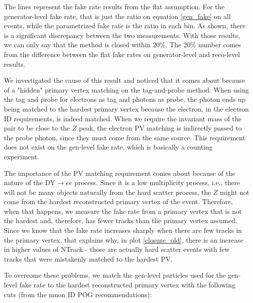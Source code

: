 
The lines represent the fake rate results from the flat assumption. For the generator-level fake rate, that is just the ratio on equation \ref{gen_fake} on all events, while the parametrized fake rate is the ratio in each bin. As shown, there is a significant discrepancy between the two measurements. With those results, we can only say that the method is closed within 20\%. The 20\% number comes from the difference between the flat fake rates on generator-level and reco-level results.

We investigated the cause of this result and noticed that it comes about because of a "hidden" primary vertex matching on the tag-and-probe method. When using the tag and probe for electrons as tag and photons as probe, the photon ends up being matched to the hardest primary vertex because the electron, in the electron ID requirements, is indeed matched. When we require the invariant mass of the pair to be close to the $Z$ peak, the electron PV matching is indirectly passed to the probe photon, since they must come from the same source. This requirement does not exist on the gen-level fake rate, which is basically a counting experiment.

The importance of the PV matching requirement comes about because of the nature of the DY$\to ee$ process. Since it is a low multiplicity process, i.e., there will not be many objects naturally from the hard scatter process, the $Z$ might not come from the hardest reconstructed primary vertex of the event. Therefore, when that happens, we measure the fake rate from a  primary vertex that is not the hardest and, therefore, has fewer tracks than the primary vertex assumed. Since we know that the fake rate increases sharply when there are few tracks in the primary vertex, that explains why, in plot \ref{closure_old}, there is an increase in higher values of NTrack - those are actually hard scatter events with few tracks that were mistakenly matched to the hardest PV.

To overcome these problems, we match the gen-level particles used for the gen-level fake rate to the hardest reconstructed primary vertex with the following cuts (from the muon ID POG recommendations):

